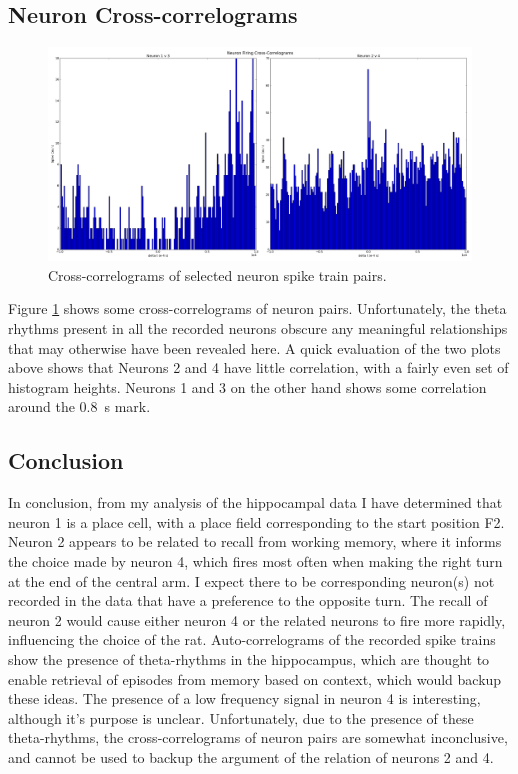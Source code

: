 \documentclass[a4paper, 10pt]{article}
\begin{document}
\subsection*{Neuron Cross-correlograms}
\begin{figure}[H]
  \centering
  \includegraphics[width=1.0\textwidth]{neuron_xcorr_plot.png}
  \caption{Cross-correlograms of selected neuron spike train pairs.}
  \label{fig:xcorr}
\end{figure}

Figure \ref{fig:xcorr} shows some cross-correlograms of neuron
pairs. Unfortunately, the theta rhythms present in all the recorded neurons
obscure any meaningful relationships that may otherwise have been revealed
here. A quick evaluation of the two plots above shows that Neurons 2 and 4 have
little correlation, with a fairly even set of histogram heights. Neurons 1 and 3
on the other hand shows some correlation around the \SI{0.8}{\second} mark.

\subsection*{Conclusion}

In conclusion, from my analysis of the hippocampal data I have determined that
neuron 1 is a place cell, with a place field corresponding to the start position
F2. Neuron 2 appears to be related to recall from working memory, where it
informs the choice made by neuron 4, which fires most often when making the
right turn at the end of the central arm. I expect there to be corresponding
neuron(s) not recorded in the data that have a preference to the opposite
turn. The recall of neuron 2 would cause either neuron 4 or the related neurons
to fire more rapidly, influencing the choice of the rat. Auto-correlograms of
the recorded spike trains show the presence of theta-rhythms in the hippocampus,
which are thought to enable retrieval of episodes from memory based on context,
which would backup these ideas. The presence of a low frequency signal in neuron
4 is interesting, although it's purpose is unclear. Unfortunately, due to the
presence of these theta-rhythms, the cross-correlograms of neuron pairs are
somewhat inconclusive, and cannot be used to backup the argument of the relation
of neurons 2 and 4.
\end{document}

